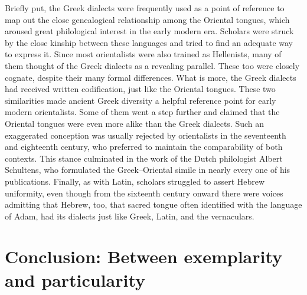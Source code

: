Briefly put, the Greek dialects were frequently used as a point of reference to map out the close genealogical relationship among the Oriental tongues, which aroused great philological interest in the early modern era. Scholars were struck by the close kinship between these languages and tried to find an adequate way to express it. Since most orientalists were also trained as Hellenists, many of them thought of the Greek dialects as a revealing parallel. These too were closely cognate, despite their many formal differences. What is more, the Greek dialects had received written codification, just like the Oriental tongues. These two similarities made ancient Greek diversity a helpful reference point for early modern orientalists. Some of them went a step further and claimed that the Oriental tongues were even more alike than the Greek dialects. Such an exaggerated conception was usually rejected by orientalists in the seventeenth and eighteenth century, who preferred to maintain the comparability of both contexts. This stance culminated in the work of the Dutch philologist Albert Schultens, who formulated the Greek–Oriental simile in nearly every one of his publications. Finally, as with Latin, scholars struggled to assert Hebrew uniformity, even though from the sixteenth century onward there were voices admitting that Hebrew, too, that sacred tongue often identified with the language of Adam, had its dialects just like Greek, Latin, and the vernaculars.

\section{Conclusion: Between exemplarity and particularity}

